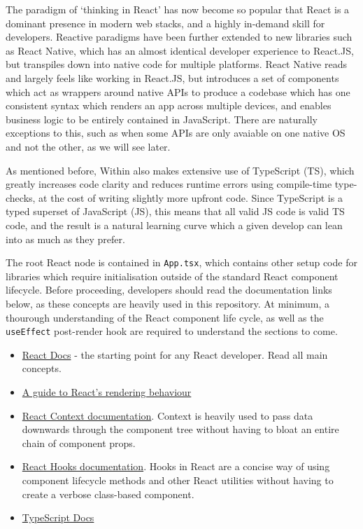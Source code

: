 The paradigm of `thinking in React' has now become so popular that React is a dominant presence in modern web stacks, and a highly in-demand skill for developers. Reactive paradigms have been further extended to new libraries such as React Native, which has an almost identical developer experience to React.JS, but transpiles down into native code for multiple platforms. React Native reads and largely feels like working in React.JS, but introduces a set of components which act as wrappers around native APIs to produce a codebase which has one consistent syntax which renders an app across multiple devices, and enables business logic to be entirely contained in JavaScript. There are naturally exceptions to this, such as when some APIs are only avaiable on one native OS and not the other, as we will see later.

As mentioned before, Within also makes extensive use of TypeScript (TS), which greatly increases code clarity and reduces runtime errors using compile-time type-checks, at the cost of writing slightly more upfront code. Since TypeScript is a typed superset of JavaScript (JS), this means that all valid JS code is valid TS code, and the result is a natural learning curve which a given develop can lean into as much as they prefer.

The root React node is contained in \texttt{App.tsx}, which contains other setup code for libraries which require initialisation outside of the standard React component lifecycle. Before proceeding, developers should read the documentation links below, as these concepts are heavily used in this repository. At minimum, a thourough understanding of the React component life cycle, as well as the \texttt{useEffect} post-render hook are required to understand the sections to come.

\begin{itemize}
    \item \href{https://reactjs.org/docs/hello-world.html}{React Docs} - the starting point for any React developer. Read all main concepts.
    \item \href{https://blog.isquaredsoftware.com/2020/05/blogged-answers-a-mostly-complete-guide-to-react-rendering-behavior/#rendering-process-overview}{A guide to React's rendering behaviour}
    \item \href{https://reactjs.org/docs/context.html}{React Context documentation}. Context is heavily used to pass data downwards through the component tree without having to bloat an entire chain of component props.
    \item \href{https://reactjs.org/docs/hooks-intro.html}{React Hooks documentation}. Hooks in React are a concise way of using component lifecycle methods and other React utilities without having to create a verbose class-based component.
    \item \href{https://www.TypeScriptlang.org/docs/}{TypeScript Docs}
\end{itemize}

